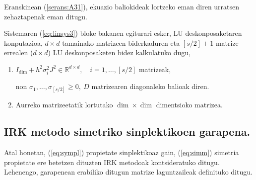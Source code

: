 Eranskinean (\ref{serans:A31}), ekuazio baliokideak lortzeko eman diren urratsen zehaztapenak eman ditugu. 

Sistemaren (\ref{eq:linsys3}) bloke bakanen egiturari esker, LU deskonposaketaren konputazioa, $d \times d$ tamainako matrizeen biderkaduren eta $[s/2]+1$ matrize errealen ($d \times d$) LU deskonposaketen bidez kalkulatuko dugu,
\begin{enumerate}
\item $I_\dim + h^2 \sigma_i^2 J^2 \in \mathbb{R}^{d \times d}, \quad i=1,\ldots,[s/2]$ matrizeak,

non $\sigma_1,\ldots,\sigma_{[s/2]} \geq 0 , \ D$ matrizearen diagonaleko balioak diren.
\item Aurreko matrizeetatik lortutako $\dim \times \dim$ dimentsioko matrizea.
\end{enumerate} 


\subsection{IRK metodo simetriko sinplektikoen garapena.}
\label{ss:734}

Atal honetan, (\ref{eq:sympl}) propietate sinplektikoaz gain, (\ref{eq:simm}) simetria propietate  ere betetzen dituzten IRK metodoak kontsideratuko ditugu. Lehenengo, garapenean erabiliko ditugun matrize laguntzaileak definituko ditugu.

